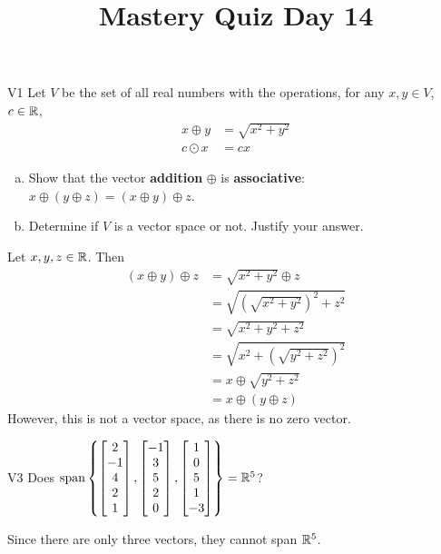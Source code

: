 \documentclass{sbgLAquiz}
\title{Mastery Quiz Day 14 }
\begin{document}
\begin{problem}{V1}
Let $V$ be the set of all real numbers with the operations, for any $x, y \in V$, $c \in \mathbb{R}$,
\begin{align*}
x \oplus y &= \sqrt{x^2+y^2} \\
c \odot x &= c x
\end{align*}
\begin{enumerate}[(a)]
\item Show that the vector \textbf{addition} $\oplus$ is \textbf{associative}:
      \(x \oplus (y \oplus z)=(x\oplus y)\oplus z\).
\item Determine if $V$ is a vector space or not.  Justify your answer.
\end{enumerate}
\end{problem}
\begin{solution}
Let $x,y,z \in \mathbb{R}$.  Then
\begin{align*}
(x\oplus y) \oplus z &= \sqrt{x^2+y^2} \oplus z \\&= \sqrt{ (\sqrt{x^2+y^2})^2+z^2} \\&= \sqrt{x^2+y^2+z^2} \\
&= \sqrt{x^2+(\sqrt{y^2+z^2})^2} \\ &= x \oplus \sqrt{y^2+z^2} \\ &= x \oplus (y \oplus z)
\end{align*}
However, this is not a vector space, as there is no zero vector.
\end{solution}
\begin{problem}{V3}
Does
\(
  \operatorname{span}\left\{
    \begin{bmatrix} 2 \\ -1 \\ 4 \\ 2 \\ 1 \end{bmatrix},
    \begin{bmatrix} -1 \\ 3 \\ 5 \\ 2 \\ 0 \end{bmatrix},
    \begin{bmatrix} 1 \\ 0 \\ 5 \\ 1 \\ -3 \end{bmatrix}
  \right\} = \mathbb{R}^5
\)?
\end{problem}
\begin{solution}
Since there are only three vectors, they cannot span \(\mathbb{R}^5\).
\end{solution}
\end{document}
